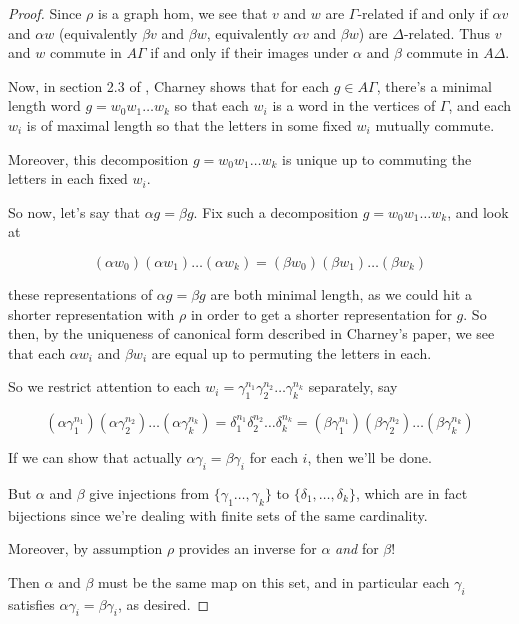 \documentclass[12pt]{article}
\theoremstyle{definition}
\theoremstyle{theorem}
\begin{document}
\begin{proof}
    Since $\rho$ is a graph
    hom, we see that $v$ and $w$ are $\Gamma$-related if and only if $\alpha v$
    and $\alpha w$ (equivalently $\beta v$ and $\beta w$, equivalently $\alpha v$ and $\beta w$) 
    are $\Delta$-related. Thus $v$ and $w$ commute in $A \Gamma$ if and only 
    if their images under $\alpha$ and $\beta$ commute in $A \Delta$.

    Now, in section 2.3 of \cite{charneyIntroductionRightangledArtin2007},
    Charney shows that for each $g \in A\Gamma$,
    there's a minimal length word $g = w_0 w_1 \ldots w_k$ so that each 
    $w_i$ is a word in the vertices of $\Gamma$, and each $w_i$ is of maximal 
    length so that the letters in some fixed $w_i$ mutually commute.

    Moreover, this decomposition $g = w_0 w_1 \ldots w_k$ is unique up to 
    commuting the letters in each fixed $w_i$.

    So now, let's say that $\alpha g = \beta g$. Fix such a decomposition
    $g = w_0 w_1 \ldots w_k$, and look at 

    \[ (\alpha w_0) (\alpha w_1) \ldots (\alpha w_k) = (\beta w_0) (\beta w_1) \ldots (\beta w_k) \]

    these representations of $\alpha g = \beta g$ are both minimal length, as 
    we could hit a shorter representation with $\rho$ in order to get a 
    shorter representation for $g$. So then, by the uniqueness of canonical form 
    described in Charney's paper, 
    we see that each $\alpha w_i$ and $\beta w_i$ are equal up to permuting the 
    letters in each. 
    
    So we restrict attention to each 
    $w_i = \gamma_1^{n_1} \gamma_2^{n_2} \ldots \gamma_k^{n_k}$ separately, say

    \[ 
    (\alpha \gamma_1^{n_1}) (\alpha \gamma_2^{n_2}) \ldots (\alpha \gamma_k^{n_k}) = 
    \delta_1^{n_1} \delta_2^{n_2} \ldots \delta_k^{n_k} =
    (\beta \gamma_1^{n_1}) (\beta \gamma_2^{n_2}) \ldots (\beta \gamma_k^{n_k})
    \]

    If we can show that actually $\alpha \gamma_i = \beta \gamma_i$ for each $i$,
    then we'll be done.

    But $\alpha$ and $\beta$ give injections from $\{ \gamma_1 \ldots, \gamma_k \}$
    to $\{ \delta_1, \ldots, \delta_k \}$, which are in fact bijections since we're
    dealing with finite sets of the same cardinality. 

    Moreover, by assumption $\rho$ provides an inverse for $\alpha$ \emph{and} 
    for $\beta$!

    Then $\alpha$ and $\beta$ must be the same map on this set, and in particular
    each $\gamma_i$ satisfies $\alpha \gamma_i = \beta \gamma_i$, as desired.
\end{proof}
\end{document}
